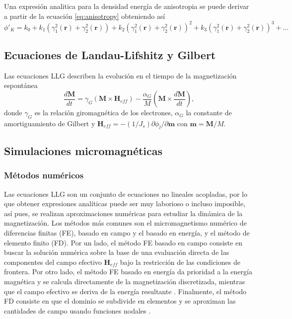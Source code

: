 Una expresión analitica para la densidad energía de anisotropia se puede derivar a partir de la ecuación \ref{eq:anisotropy} obteniendo así \[ \phi'_K = k_0 + k_1 (\gamma_1^2 (\mathbf{r}) + \gamma_2^2 (\mathbf{r})) + k_2 (\gamma_1^2 (\mathbf{r}) + \gamma_2^2 (\mathbf{r}))^2 + k_3 (\gamma_1^2 (\mathbf{r}) + \gamma_2^2 (\mathbf{r}))^3 + \dotsc \]

\subsection{Ecuaciones de Landau-Lifshitz y Gilbert}
Las ecuaciones LLG describen la evolución en el tiempo de la magnetización espontánea \cite{Exl2020} \[ \frac{d \mathbf{M}}{dt} = \gamma_G (\mathbf{M} \times \mathbf{H}_{eff}) - \frac{\alpha_G}{M}(\mathbf{M} \times \frac{d \mathbf{M}}{dt}),\] donde $\gamma_G$ es la relación giromagnética de los electrones, $\alpha_G$ la constante de amortiguamiento de Gilbert y $\mathbf{H}_{eff} = - (1/J_s) \partial \phi_l / \partial \mathbf{m}$ con $\mathbf{m} = \mathbf{M}/M$. 
\subsection{Simulaciones micromagnéticas}
\subsubsection{Métodos numéricos}
Las ecuaciones LLG son un conjunto de ecuaciones no lineales acopladas, por lo que obtener expresiones analíticas puede ser muy laborioso o incluso imposible, así pues, se realizan aproximaciones numéricas para estudiar la dinámica de la magnetización. Los métodos más comunes son el micromagnetismo numérico de diferencias finitas (FE), basado en campo y el basado en energía, y el método de elemento finito (FD). Por un lado, el método FE basado en campo consiste en buscar la solución numérica sobre la base de una evaluación directa de las componentes del campo efectivo $\mathbf{H}_{eff}$ bajo la restricción de las condiciones de frontera. Por otro lado, el método FE basado en energía da prioridad a la energía magnética y se calcula directamente de la magnetización discretizada, mientras que el campo efectivo se deriva de la energía resultante \cite{miltat2007numerical}. Finalmente, el método FD consiste en que el dominio se subdivide en elementos y se aproximan las cantidades de campo usando funciones nodales \cite{FiniteElement}.

